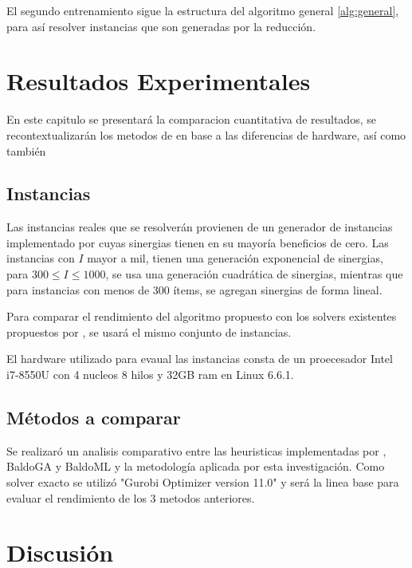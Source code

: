 \documentclass[spanish, a4paper, 12pt, twoside, openany,final]{book}
\numberwithin{equation}{section}
\begin{document}
El segundo entrenamiento sigue la estructura del algoritmo general \ref{alg:general}, para así resolver instancias que son generadas por la reducción.

 
\clearpage
\chapter{Resultados Experimentales}
En este capitulo se presentará la comparacion cuantitativa de resultados, se recontextualizarán los metodos de \cite{baldo_polynomial_2023} en base a las diferencias de hardware, así como también

\section{Instancias}

Las instancias reales que se resolverán provienen de un generador de instancias implementado por \cite{baldo_polynomial_2023} cuyas sinergias tienen en su mayoría beneficios de cero. Las instancias con $I$ mayor a mil, tienen una generación exponencial de sinergias, para $300 \le I \le 1000$, se usa una generación cuadrática de sinergias, mientras que para instancias con menos de 300 ítems, se agregan sinergias de forma lineal.

Para comparar el rendimiento del algoritmo propuesto con los solvers existentes propuestos por \cite{baldo_polynomial_2023}, se usará el mismo conjunto de instancias.

El hardware utilizado para evaual las instancias consta de un proecesador Intel i7-8550U con 4 nucleos 8 hilos y 32GB ram en Linux 6.6.1.


\section{Métodos a comparar}

Se realizaró un analisis comparativo entre las heuristicas implementadas por \cite{baldo_polynomial_2023}, BaldoGA y BaldoML y la metodología aplicada por esta investigación. Como solver exacto se utilizó "Gurobi Optimizer version 11.0" y será la linea base para evaluar el rendimiento de los 3 metodos anteriores.

\subsec





\chapter{Discusión}
    
\end{document}
